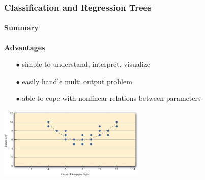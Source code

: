 \begin{frame}
	\frametitle{Classification and Regression Trees}
		\framesubtitle{Summary}

		
		\textbf{Advantages}
		\begin{center}
		\begin{itemize}
		  \item[$\bullet$] simple to understand, interpret, visualize
		  \item[$\bullet$] easily handle multi output problem
		  \item[$\bullet$] able to cope with nonlinear relations between parameters
		\end{itemize}
		
		\vfill
		
		\includegraphics[width=7cm]{./figures/pros}
		\end{center}
		
\end{frame}

